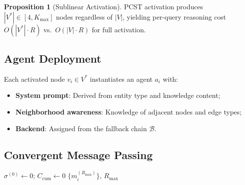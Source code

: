 \documentclass[a4paper,11pt]{article}
\theoremstyle{definition}
\newtheorem{proposition}{Proposition}[section]
\begin{document}
\begin{proposition}[Sublinear Activation]
\label{prop:sublinear}
PCST activation produces $|V^*| \in [4, K_{\max}]$ nodes regardless of $|V|$, yielding per-query reasoning cost $O(|V^*| \cdot R)$ vs.\ $O(|V| \cdot R)$ for full activation.
\end{proposition}

\subsection{Agent Deployment}

Each activated node $v_i \in V^*$ instantiates an agent $a_i$ with:

\begin{itemize}
\item \textbf{System prompt}: Derived from entity type and knowledge content;
\item \textbf{Neighborhood awareness}: Knowledge of adjacent nodes and edge types;
\item \textbf{Backend}: Assigned from the fallback chain $\mathcal{B}$.
\end{itemize}

\subsection{Convergent Message Passing}
\label{sec:convergence}

\begin{algorithm}[ht]
\caption{Convergent Message Passing}
\label{alg:message_passing}

$\sigma^{(0)} \gets 0$; $C_{\mathrm{cum}} \gets 0$\;
\Return $\{m_i^{(R_{\max})}\}$, $R_{\max}$ 
\end{algorithm}
\end{document}
